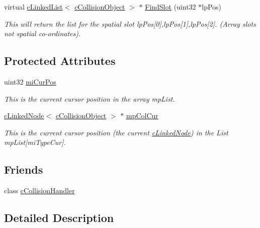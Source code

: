 \begin{DoxyCompactItemize}
virtual \hyperlink{classc_linked_list}{cLinkedList}$<$ \hyperlink{classc_collision_object}{cCollisionObject} $>$ $\ast$ \hyperlink{classc_collision_handler_type_ab9b89db564fb5a2b4881499012443a72}{FindSlot} (uint32 $\ast$lpPos)
\begin{DoxyCompactList}\small\item\em This will return the list for the spatial slot lpPos\mbox{[}0\mbox{]},lpPos\mbox{[}1\mbox{]},lpPos\mbox{[}2\mbox{]}. (Array slots not spatial co-\/ordinates). \item\end{DoxyCompactList}\end{DoxyCompactItemize}
\subsection*{Protected Attributes}
\begin{DoxyCompactItemize}
\item 
uint32 \hyperlink{classc_collision_handler_type_a56edc1dc263cc86212aa18a0a9334162}{miCurPos}
\begin{DoxyCompactList}\small\item\em This is the current cursor position in the array mpList. \item\end{DoxyCompactList}\item 
\hyperlink{classc_linked_node}{cLinkedNode}$<$ \hyperlink{classc_collision_object}{cCollisionObject} $>$ $\ast$ \hyperlink{classc_collision_handler_type_a1c766c06d73857bacdbf00c6eadb7836}{mpColCur}
\begin{DoxyCompactList}\small\item\em This is the current cursor position (the current \hyperlink{classc_linked_node}{cLinkedNode}) in the List mpList\mbox{[}miTypeCur\mbox{]}. \item\end{DoxyCompactList}\end{DoxyCompactItemize}
\subsection*{Friends}
\begin{DoxyCompactItemize}
\item 
class \hyperlink{classc_collision_handler_type_a2dee8095fea5c5aa41fe4060393f31ad}{cCollisionHandler}
\end{DoxyCompactItemize}


\subsection{Detailed Description}


